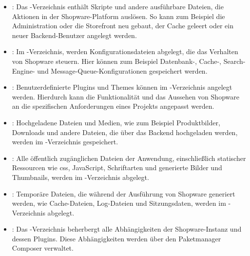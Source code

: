     \begin{itemize}
        \item {
            :
            Das -Verzeichnis enthält Skripte und andere ausführbare Dateien, die Aktionen in der
            Shopware-Platform auslösen.
            So kann zum Beispiel die Administration oder die Storefront neu gebaut, der Cache geleert oder ein neuer
            Backend-Benutzer angelegt werden.
        }

        \item {
            :
            Im -Verzeichnis, werden Konfigurationsdateien abgelegt, die das Verhalten von
            Shopware steuern.
            Hier können zum Beispiel Datenbank-, Cache-, Search-Engine- und Message-Queue-Konfigurationen gespeichert
            werden.
        }

        \item {
            :
            Benutzerdefinierte Plugins und Themes können im -Verzeichnis angelegt werden.
            Hierdurch kann die Funktionalität und das Aussehen von Shopware an die spezifischen Anforderungen eines
            Projekts angepasst werden.
        }

        \item {
            :
            Hochgeladene Dateien und Medien, wie zum Beispiel Produktbilder, Downloads und andere Dateien, die über das
            Backend hochgeladen werden, werden im -Verzeichnis gespeichert.
        }

        \item {
            :
            Alle öffentlich zugänglichen Dateien der Anwendung, einschließlich statischer Ressourcen wie \acrshort{css},
            JavaScript, Schriftarten und generierte Bilder und Thumbnails, werden im -Verzeichnis
            abgelegt.
        }
    \end{itemize}
\endgroup

\clearpage

\begin{itemize}
    \item {
        :
        Temporäre Dateien, die während der Ausführung von Shopware generiert werden, wie Cache-Dateien, Log-Dateien und
        Sitzungsdaten, werden im -Verzeichnis abgelegt.
    }

    \item {
        :
        Das -Verzeichnis beherbergt alle Abhängigkeiten der Shopware-Instanz und dessen Plugins.
        Diese Abhängigkeiten werden über den Paketmanager Composer verwaltet.
    }
\end{itemize}

